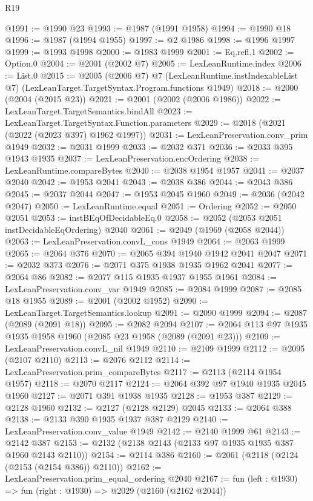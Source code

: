 \begin{lexlean}{R19}
\begin{coremodule}
{{{{{{{{{{{{{{{{{{{{{{{{{{{{{{{{{{{{{{{{{{{{{{{{{{{{{{{{{{{{{{{{{{{{{{{{{{{{{{{{{{{{{{{@1991 := @1990 @23
@1993 := @1987 (@1991 @1958)
@1994 := @1990 @18
@1996 := @1987 (@1994 @1955)
@1997 := @2 @1986
@1998 := @1996 @1997
@1999 := @1993 @1998
@2000 := @1983 @1999
@2001 := Eq.refl.{1}
@2002 := Option.{0}
@2004 := @2001 (@2002 @7)
@2005 := LexLeanRuntime.index
@2006 := List.{0}
@2015 := @2005
    (@2006 @7)
    @7
    (LexLeanRuntime.instIndexableList @7)
    (LexLeanTarget.TargetSyntax.Program.functions @1949)
@2018 := @2000 (@2004 (@2015 @23))
@2021 := @2001 (@2002 (@2006 @1986))
@2022 := LexLeanTarget.TargetSemantics.bindAll
@2023 := LexLeanTarget.TargetSyntax.Function.parameters
@2029 := @2018 (@2021 (@2022 (@2023 @397) @1962 @1997))
@2031 := LexLeanPreservation.conv_prim @1949
@2032 := @2031 @1999
@2033 := @2032 @371
@2036 := @2033 @395 @1943 @1935
@2037 := LexLeanPreservation.encOrdering
@2038 := LexLeanRuntime.compareBytes
@2040 := @2038 @1954 @1957
@2041 := @2037 @2040
@2042 := @1953 @2041
@2043 := @2038 @386
@2044 := @2043 @386
@2045 := @2037 @2044
@2047 := @1953 @2045 @1960
@2049 := @2036 (@2042 @2047)
@2050 := LexLeanRuntime.equal
@2051 := Ordering
@2052 := @2050 @2051
@2053 := instBEqOfDecidableEq.{0}
@2058 := @2052 (@2053 @2051 instDecidableEqOrdering) @2040
@2061 := @2049 (@1969 (@2058 @2044))
@2063 := LexLeanPreservation.convL_cons @1949
@2064 := @2063 @1999
@2065 := @2064 @376
@2070 := @2065 @394 @1940 @1942 @2041 @2047
@2071 := @2032 @373
@2076 := @2071 @375 @1938 @1935 @1962 @2041
@2077 := @2064 @86
@2082 := @2077 @115 @1935 @1937 @1955 @1961
@2084 := LexLeanPreservation.conv_var @1949
@2085 := @2084 @1999
@2087 := @2085 @18 @1955
@2089 := @2001 (@2002 @1952)
@2090 := LexLeanTarget.TargetSemantics.lookup
@2091 := @2090 @1999
@2094 := @2087 (@2089 (@2091 @18))
@2095 := @2082 @2094
@2107 := @2064 @113 @97 @1935 @1935 @1958 @1960 (@2085 @23 @1958 (@2089 (@2091 @23)))
@2109 := LexLeanPreservation.convL_nil @1949
@2110 := @2109 @1999
@2112 := @2095 (@2107 @2110)
@2113 := @2076 @2112
@2114 := LexLeanPreservation.prim_compareBytes
@2117 := @2113 (@2114 @1954 @1957)
@2118 := @2070 @2117
@2124 := @2064 @392 @97 @1940 @1935 @2045 @1960
@2127 := @2071 @391 @1938 @1935
@2128 := @1953 @387
@2129 := @2128 @1960
@2132 := @2127 (@2128 @2129) @2045
@2133 := @2064 @388
@2138 := @2133 @390 @1935 @1937 @387 @2129
@2140 := LexLeanPreservation.conv_value @1949
@2142 := @2140 @1999 @61
@2143 := @2142 @387
@2153 := @2132 (@2138 @2143 (@2133 @97 @1935 @1935 @387 @1960 @2143 @2110))
@2154 := @2114 @386
@2160 := @2061 (@2118 (@2124 (@2153 (@2154 @386)) @2110))
@2162 := LexLeanPreservation.prim_equal_ordering @2040
@2167 := fun (left : @1930) => fun (right : @1930) => @2029 (@2160 (@2162 @2044))
}}}}}}}}}}}}}}}}}}}}}}}}}}}}}}}}}}}}}}}}}}}}}}}}}}}}}}}}}}}}}}}}}}}}}}}}}}}}}}}}}}}}}}}
\end{coremodule}
\end{lexlean}
